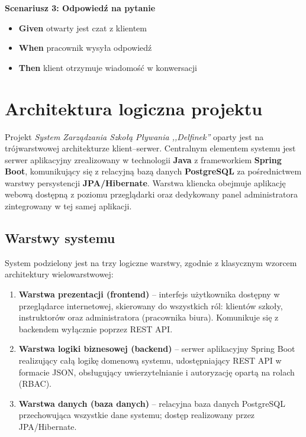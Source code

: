 \documentclass[a4paper,12pt]{article}
\begin{document}
\textbf{Scenariusz 3: Odpowiedź na pytanie}
\begin{itemize}
    \item \textbf{Given} otwarty jest czat z klientem
    \item \textbf{When} pracownik wysyła odpowiedź
    \item \textbf{Then} klient otrzymuje wiadomość w konwersacji
\end{itemize}

\section{Architektura logiczna projektu}
 
Projekt \textit{System Zarządzania Szkołą Pływania ,,Delfinek''} oparty jest na trójwarstwowej architekturze klient--serwer. Centralnym elementem systemu jest serwer aplikacyjny zrealizowany w technologii \textbf{Java} z frameworkiem \textbf{Spring Boot}, komunikujący się z relacyjną bazą danych \textbf{PostgreSQL} za pośrednictwem warstwy persystencji \textbf{JPA/Hibernate}. Warstwa kliencka obejmuje aplikację webową dostępną z poziomu przeglądarki oraz dedykowany panel administratora zintegrowany w tej samej aplikacji.
 
\subsection{Warstwy systemu}
 
System podzielony jest na trzy logiczne warstwy, zgodnie z klasycznym wzorcem architektury wielowarstwowej:
 
\begin{enumerate}
    \item \textbf{Warstwa prezentacji (frontend)} -- interfejs użytkownika dostępny w przeglądarce internetowej, skierowany do wszystkich ról: klientów szkoły, instruktorów oraz administratora (pracownika biura). Komunikuje się z backendem wyłącznie poprzez REST API.
    \item \textbf{Warstwa logiki biznesowej (backend)} -- serwer aplikacyjny Spring Boot realizujący całą logikę domenową systemu, udostępniający REST API w formacie JSON, obsługujący uwierzytelnianie i autoryzację opartą na rolach (RBAC).
    \item \textbf{Warstwa danych (baza danych)} -- relacyjna baza danych PostgreSQL przechowująca wszystkie dane systemu; dostęp realizowany przez JPA/Hibernate.
\end{enumerate}
 
\end{document}
